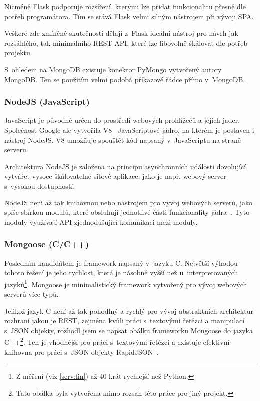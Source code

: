 Nicméně Flask podporuje rozšíření, kterými lze přidat funkcionalitu přesně dle potřeb programátora. Tím se stává Flask velmi silným nástrojem při vývoji SPA.

Veškeré zde zmíněné skutečnosti dělají z~Flask ideální nástroj pro návrh jak rozsáhlého, tak minimálního REST API, které lze libovolně škálovat dle potřeb projektu.

S~ohledem na MongoDB existuje konektor PyMongo vytvořený autory MongoDB. Ten se použitím velmi podobá příkazové řádce přímo v~MongoDB. 

\subsubsection*{NodeJS (JavaScript)}

JavaScript je původně určen do prostředí webových prohlížečů a jejich jader. Společnost Google ale vytvořila V8~\cite{google:v8} JavaScriptové jádro, na kterém je postaven i nástroj NodeJS. V8 umožňuje spouštět kód napsaný v~JavaScriptu na straně serveru.

Architektura NodeJS je založena na principu asynchronních událostí dovolující vytvářet vysoce škálovatelné síťové aplikace, jako je např. webový server s~vysokou dostupností.

NodeJS není až tak knihovnou nebo nástrojem pro vývoj webových serverů, jako spíše sbírkou modulů, které obsluhují jednotlivé části funkcionality jádra~\cite{nodejs}. Tyto moduly využívají API zjednodušující komunikaci mezi moduly.

\subsubsection*{Mongoose (C/C++)}

Posledním kandidátem je framework napsaný v~jazyku C. Největší výhodou tohoto řešení je jeho rychlost, která je násobně vyšší než u~interpretovaných jazyků\footnote{Z měření (viz \ref{serv:fin}) až 40 krát rychlejší než Python.}. Mongoose je minimalistický framework vytvořený pro vývoj webových serverů více typů.

Jelikož jazyk C není až tak pohodlný a rychlý pro vývoj abstraktních architektur rozhraní jakou je REST, zejména kvůli práci s~textovými řetězci a manipulací s~JSON objekty, rozhodl jsem se napsat obálku frameworku Mongoose do jazyka C++\footnote{Tato obálka byla vytvořena mimo rozsah této práce pro jiný projekt.}. Ten je vhodnější pro práci s~textovými řetězci a existuje efektivní knihovna pro práci s~JSON objekty RapidJSON~\cite{js:rjson}.

